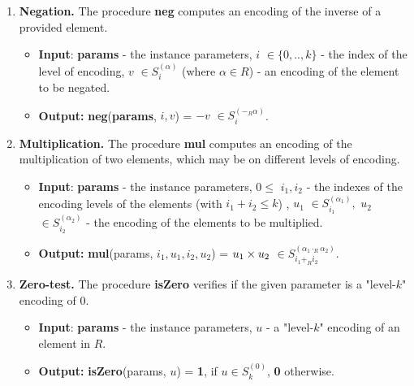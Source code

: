 \begin{enumerate}[label=(\alph*)]
	
	\item \textbf{Negation.} The procedure \textbf{neg} computes an encoding of the inverse of a provided element.
	\begin{itemize}
		\item \textbf{Input}: \textbf{params} - the instance parameters, {\boldmath$i$} $ \in \{0,..,k\}$ - the index of the level of encoding, {\boldmath$v$} $\in S_i^{(\alpha)}$ (where $\alpha\in R$) - an encoding of the element to be negated.
		\item \textbf{Output:} \textbf{neg}(\textbf{params}, $i, v$) = {\boldmath $-v $} $\in S_i^{(-_R\alpha)}$.
	\end{itemize}


	\item \textbf{Multiplication.} The procedure \textbf{mul} computes an encoding of the multiplication of two elements, which may be on different levels of encoding.
	\begin{itemize}
		\item \textbf{Input}: \textbf{params} - the instance parameters, $0 \leq$ {\boldmath$ i_1, i_2 $} - the indexes of the encoding levels of the elements (with $i_1 + i_2 \leq k$) , {\boldmath$u_1$} $ \in S_{i_1}^{(\alpha_1)},$ {\boldmath$ u_2$} $ \in S_{i_2}^{(\alpha_2)}$ - the encoding of the elements to be multiplied.
		\item \textbf{Output:} \textbf{mul}(params, $i_1,u_1,i_2,u_2$) = {\boldmath$u_1 \times u_2$} $ \in S_{i_1+_R i_2}^{(\alpha_1 \cdot_R \alpha_2)}$.
	\end{itemize}

	\item \textbf{Zero-test.} The procedure \textbf{isZero} verifies if the given parameter is a "level-$k$" encoding of 0.
	\begin{itemize}
		\item \textbf{Input}: \textbf{params} - the instance parameters, {\boldmath$u$} - a "level-$k$" encoding of an element in $R$.
		\item \textbf{Output:} \textbf{isZero}(params, $u$) = \textbf{1}, if $u \in S_k^{(0)}$, \textbf{0} otherwise.
	\end{itemize}


\end{enumerate}
